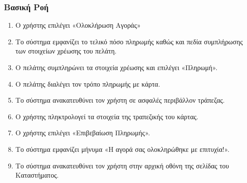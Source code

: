 \documentclass[12pt,a4paper,twoside]{book}
\begin{document}
\subsubsection{Βασική Ροή}
\begin{enumerate}
  \item Ο χρήστης επιλέγει «Ολοκλήρωση Αγοράς» %
  \item Το σύστημα εμφανίζει το τελικό πόσο πληρωμής καθώς και πεδία συμπλήρωσης των στοιχείων χρέωσης του πελάτη.  %
  \item Ο πελάτης συμπληρώνει τα στοιχεία χρέωσης και επιλέγει «Πληρωμή».  %
  \item Ο πελάτης διαλέγει τον τρόπο πληρωμής με κάρτα. %
  \item Το σύστημα ανακατευθύνει τον χρήστη σε ασφαλές περιβάλλον τράπεζας. %
  \item Ο χρήστης πληκτρολογεί τα στοιχεία της τραπεζικής του κάρτας. %
  \item Ο χρήστης επιλέγει «Επιβεβαίωση Πληρωμής». %
  \item Το σύστημα εμφανίζει μήνυμα «Η αγορά σας ολοκληρώθηκε με επιτυχία!». %
  \item Το σύστημα ανακατευθύνει τον χρήστη στην αρχική οθόνη της σελίδας του Καταστήματος. %
\end{enumerate}
\end{document}

